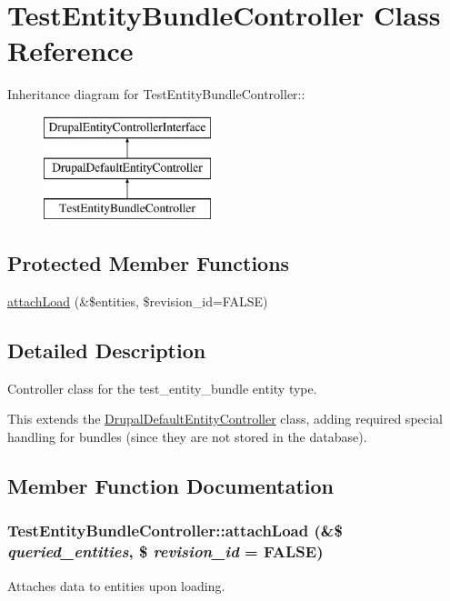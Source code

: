 \hypertarget{classTestEntityBundleController}{
\section{TestEntityBundleController Class Reference}
\label{classTestEntityBundleController}
}
Inheritance diagram for TestEntityBundleController::\begin{figure}[H]
\begin{center}
\leavevmode
\includegraphics[height=3cm]{classTestEntityBundleController}
\end{center}
\end{figure}
\subsection*{Protected Member Functions}
\begin{DoxyCompactItemize}
\item 
\hyperlink{classTestEntityBundleController_a8033ce2e754ee5c644da047738dd8835}{attachLoad} (\&\$entities, \$revision\_\-id=FALSE)
\end{DoxyCompactItemize}


\subsection{Detailed Description}
Controller class for the test\_\-entity\_\-bundle entity type.

This extends the \hyperlink{classDrupalDefaultEntityController}{DrupalDefaultEntityController} class, adding required special handling for bundles (since they are not stored in the database). 

\subsection{Member Function Documentation}
\hypertarget{classTestEntityBundleController_a8033ce2e754ee5c644da047738dd8835}{
\subsubsection[{attachLoad}]{\setlength{\rightskip}{0pt plus 5cm}TestEntityBundleController::attachLoad (\&\$ {\em queried\_\-entities}, \/  \$ {\em revision\_\-id} = {\ttfamily FALSE})}}
\label{classTestEntityBundleController_a8033ce2e754ee5c644da047738dd8835}
Attaches data to entities upon loading.


